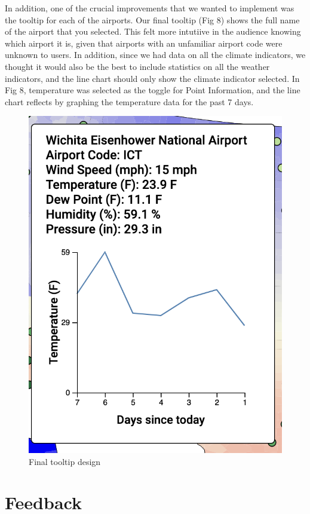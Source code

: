 \documentclass[9pt,twocolumn,twoside]{opticajnl}
\begin{document}
In addition, one of the crucial improvements that we wanted to implement was the tooltip for each of the airports. Our final tooltip (Fig 8) shows the full name of the airport that you selected. This felt more intutiive in the audience knowing which airport it is, given that airports with an unfamiliar airport code were unknown to users. In addition, since we had data on all the climate indicators, we thought it would also be the best to include statistics on all the weather indicators, and the line chart should only show the climate indicator selected. In Fig 8, temperature was selected as the toggle for Point Information, and the line chart reflects by graphing the temperature data for the past 7 days.

\begin{figure}
    \centering
    \includegraphics[scale=0.5]{images/img9.png}
    \caption{Final tooltip design}
\end{figure}

\section {Feedback}
\end{document}
